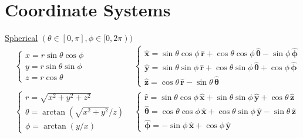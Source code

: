 \newcolumn


\section*{Coordinate Systems}
\underline{Spherical} $(\theta \in [0, \pi], \phi \in [0, 2\pi))$
\begin{align*}
&\begin{cases} 
x = r \sin\theta\cos\phi \\ 
y = r \sin\theta\sin\phi \\ 
z = r \cos\theta 
\end{cases}
&
\begin{cases} 
\mathbf{\hat{x}} = \sin\theta\cos\phi\,\mathbf{\hat{r}} + \cos\theta\cos\phi\,\bm{\hat{\theta}} - \sin\phi\,\bm{\hat{\phi}} \\
\mathbf{\hat{y}} = \sin\theta\sin\phi\,\mathbf{\hat{r}} + \cos\theta\sin\phi\,\bm{\hat{\theta}} + \cos\phi\,\bm{\hat{\phi}} \\
\mathbf{\hat{z}} = \cos\theta\,\mathbf{\hat{r}} - \sin\theta\,\bm{\hat{\theta}} 
\end{cases}
\\[0pt]
&\begin{cases} 
r = \sqrt{x^2+y^2+z^2} \\ 
\theta = \arctan(\sqrt{x^2+y^2}/z) \\ 
\phi = \arctan(y/x) 
\end{cases}
&
\begin{cases} 
\mathbf{\hat{r}} = \sin\theta\cos\phi\,\mathbf{\hat{x}} + \sin\theta\sin\phi\,\mathbf{\hat{y}} + \cos\theta\,\mathbf{\hat{z}} \\ 
\bm{\hat{\theta}} = \cos\theta\cos\phi\,\mathbf{\hat{x}} + \cos\theta\sin\phi\,\mathbf{\hat{y}} - \sin\theta\,\mathbf{\hat{z}} \\ 
\bm{\hat{\phi}} = -\sin\phi\,\mathbf{\hat{x}} + \cos\phi\,\mathbf{\hat{y}} 
\end{cases}
\end{align*}

